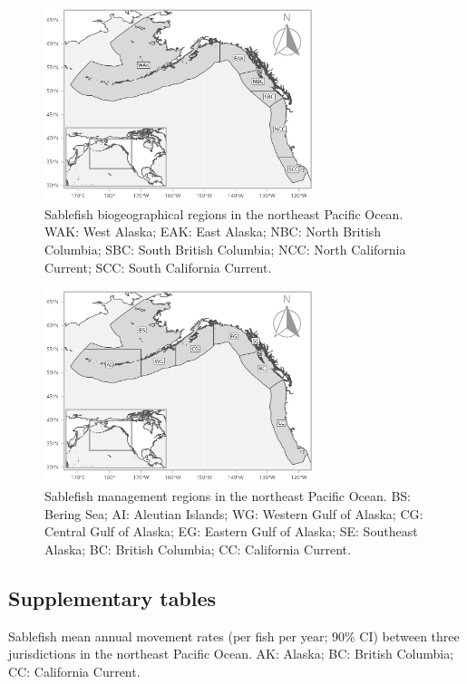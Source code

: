\documentclass{article}
\begin{document}
\begin{figure}[htb]
    \centering
    \includegraphics[width = 0.7\textwidth]{map-regions-6}
    \caption{Sablefish biogeographical regions in the northeast Pacific Ocean. WAK: West Alaska; EAK: East Alaska; NBC: North British Columbia; SBC: South British Columbia; NCC: North California Current; SCC: South California Current.}
    \label{fig:map-regions-6}
\end{figure}

\begin{figure}[htb]
    \centering
    \includegraphics[width = 0.7\textwidth]{map-regions-8}
    \caption{Sablefish management regions in the northeast Pacific Ocean. BS: Bering Sea; AI: Aleutian Islands; WG: Western Gulf of Alaska; CG: Central Gulf of Alaska; EG: Eastern Gulf of Alaska; SE: Southeast Alaska; BC: British Columbia; CC: California Current.}
    \label{fig:map-regions-8}
\end{figure}


\subsection{Supplementary tables}

\begin{table}[h]
  \begin{center}
  \caption{Sablefish mean annual movement rates (per fish per year; 90\%{} CI) between three jurisdictions in the northeast Pacific Ocean. AK: Alaska; BC: British Columbia; CC: California Current.}
  \label{tab:movement-rate-regions-3-mean}
  \end{center}
\end{table}
\end{document}
